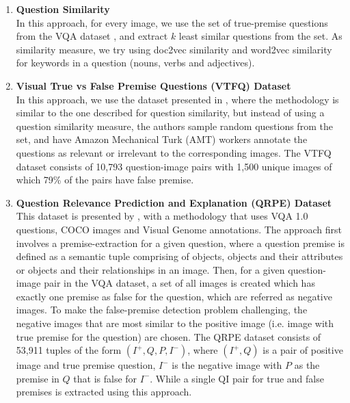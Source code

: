 \begin{enumerate}

\item \textbf{Question Similarity} \\[-10pt]

In this approach, for every image, we use the set of true-premise questions from the VQA dataset \cite{AntolALMBZP15}, and extract $k$ least similar questions from the set. As similarity measure, we try using doc2vec similarity and word2vec similarity for keywords in a question (nouns, verbs and adjectives). \\[-10pt]

\item \textbf{Visual True vs False Premise Questions (VTFQ) Dataset} \\[-10pt]

In this approach, we use the dataset presented in \cite{ray2016question}, where the methodology is similar to the one described for question similarity, but instead of using a question similarity measure, the authors sample random questions from the set, and have Amazon Mechanical Turk (AMT) workers annotate the questions as relevant or irrelevant to the corresponding images. The VTFQ dataset consists of 10,793 question-image pairs with 1,500 unique images of which 79\% of the pairs have false premise. \\[-10pt]

\item \textbf{Question Relevance Prediction and Explanation (QRPE) Dataset} \\[-10pt]

This dataset is presented by \cite{mahendru2017promise}, with a methodology that uses VQA 1.0 questions, COCO images and Visual Genome annotations. The approach first involves a premise-extraction for a given question, where a question premise is defined as a semantic tuple comprising of objects, objects and their attributes or objects and their relationships in an image. Then, for a given question-image pair in the VQA dataset, a set of all images is created which has exactly one premise as false for the question, which are referred as negative images. To make the false-premise detection problem challenging, the negative images that are most similar to the positive image (i.e. image with true premise for the question) are chosen. The QRPE dataset consists of 53,911 tuples of the form $(I^+, Q, P, I^-)$, where $(I^+, Q)$ is a pair of positive image and true premise question, $I^-$ is the negative image with $P$ as the premise in $Q$ that is false for $I^-$. While a single QI pair for true and false premises is extracted using this approach.

\end{enumerate}

